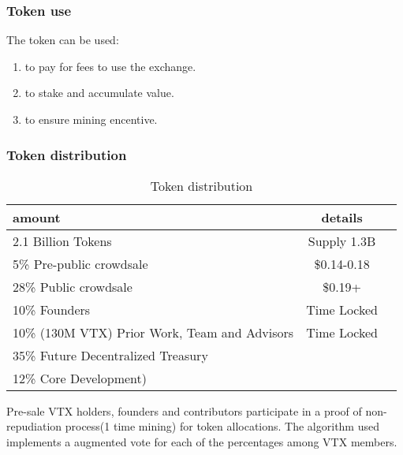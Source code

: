\documentclass[]{article}
\begin{document}
\subsubsection{Token use}

The token can be used:
\begin{enumerate}
\item to pay for fees to use the exchange.
\item to stake and accumulate value.
\item to ensure mining encentive.
\end{enumerate}
 
\subsubsection{Token distribution}	
\begin{table}[h!]
	\begin{center}
		\caption{Token distribution}
		\label{tab:table1}
		\begin{tabular}{l|c|r}
			\textbf{amount} & \textbf{details} \\
			\hline
			2.1 Billion Tokens & Supply 1.3B \\
			\hline
			\hline
			5\%  Pre-public crowdsale & \$0.14-0.18 \\
			\hline
			28\% Public crowdsale & \$0.19+ \\
			\hline
			10\% Founders & Time Locked\\
			\hline
			10\% (130M VTX) Prior Work, Team and Advisors & Time Locked\\
			\hline
			35\% Future Decentralized Treasury\\
			\hline
			12\% Core Development)\\
			\hline				
		\end{tabular}
	\end{center}
\end{table}
Pre-sale VTX holders, founders and contributors participate in a proof of non-repudiation process(1 time mining) for token allocations.
The algorithm used implements a augmented vote for each of the 
percentages among VTX members.
 
\end{document}
